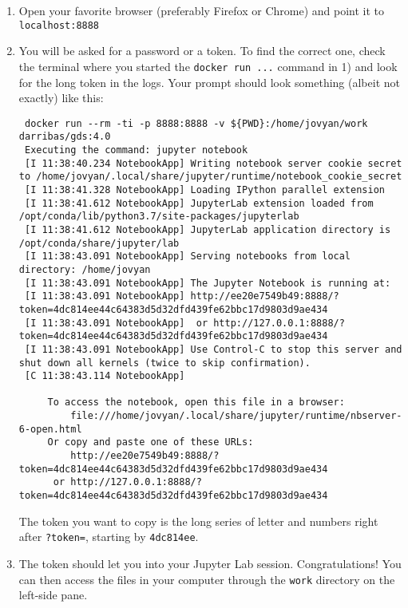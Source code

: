 \documentclass[
]{book}
\begin{document}
\begin{enumerate}
\def\labelenumi{\arabic{enumi}.}
\setcounter{enumi}{1}
\item
  Open your favorite browser (preferably Firefox or Chrome) and point it to
  \texttt{localhost:8888}
\item
  You will be asked for a password or a token. To find the correct one, check
  the terminal where you started the \texttt{docker\ run\ ...} command in 1) and look
  for the long token in the logs. Your prompt should look something (albeit
  not exactly) like this:

\begin{verbatim}
 docker run --rm -ti -p 8888:8888 -v ${PWD}:/home/jovyan/work darribas/gds:4.0
 Executing the command: jupyter notebook
 [I 11:38:40.234 NotebookApp] Writing notebook server cookie secret to /home/jovyan/.local/share/jupyter/runtime/notebook_cookie_secret
 [I 11:38:41.328 NotebookApp] Loading IPython parallel extension
 [I 11:38:41.612 NotebookApp] JupyterLab extension loaded from /opt/conda/lib/python3.7/site-packages/jupyterlab
 [I 11:38:41.612 NotebookApp] JupyterLab application directory is /opt/conda/share/jupyter/lab
 [I 11:38:43.091 NotebookApp] Serving notebooks from local directory: /home/jovyan
 [I 11:38:43.091 NotebookApp] The Jupyter Notebook is running at:
 [I 11:38:43.091 NotebookApp] http://ee20e7549b49:8888/?token=4dc814ee44c64383d5d32dfd439fe62bbc17d9803d9ae434
 [I 11:38:43.091 NotebookApp]  or http://127.0.0.1:8888/?token=4dc814ee44c64383d5d32dfd439fe62bbc17d9803d9ae434
 [I 11:38:43.091 NotebookApp] Use Control-C to stop this server and shut down all kernels (twice to skip confirmation).
 [C 11:38:43.114 NotebookApp]

     To access the notebook, open this file in a browser:
         file:///home/jovyan/.local/share/jupyter/runtime/nbserver-6-open.html
     Or copy and paste one of these URLs:
         http://ee20e7549b49:8888/?token=4dc814ee44c64383d5d32dfd439fe62bbc17d9803d9ae434
      or http://127.0.0.1:8888/?token=4dc814ee44c64383d5d32dfd439fe62bbc17d9803d9ae434
\end{verbatim}

  The token you want to copy is the long series of letter and numbers right
  after \texttt{?token=}, starting by \texttt{4dc814ee}.
\item
  The token should let you into your Jupyter Lab session. Congratulations!
  You can then access the files in your computer through the \texttt{work} directory
  on the left-side pane.
\end{enumerate}
\end{document}
